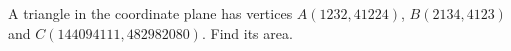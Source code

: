 A triangle in the coordinate plane has vertices $A(1232,41224)$, $B(2134,4123)$ and $C(144094111,482982080)$. Find its area.
